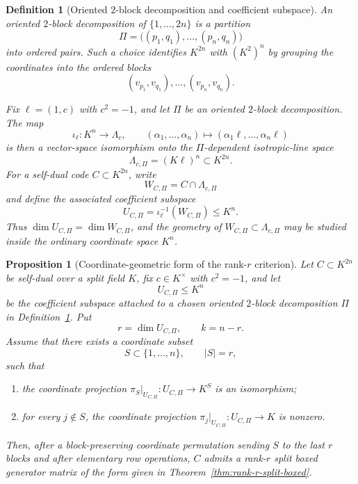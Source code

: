 \documentclass[12pt]{article}
\newtheorem{defn}{Definition}[section]
\newtheorem{prop}[theorem]{Proposition}
\begin{document}
\begin{defn}[Oriented \texorpdfstring{$2$}{2}-block decomposition and coefficient subspace]
\label{def:coefficient-subspace}
An \emph{oriented \(2\)-block decomposition} of \(\{1,\dots,2n\}\) is a partition
\[
\Pi=\bigl((p_1,q_1),\dots,(p_n,q_n)\bigr)
\]
into ordered pairs. Such a choice identifies \(K^{2n}\) with \((K^2)^n\) by grouping the coordinates into the ordered blocks
\[
(v_{p_1},v_{q_1}),\dots,(v_{p_n},v_{q_n}).
\]

Fix \(\ell=(1,c)\) with \(c^2=-1\), and let \(\Pi\) be an oriented \(2\)-block decomposition. The map
\[
\iota_\ell:K^n\longrightarrow \Lambda_c,\qquad
(\alpha_1,\dots,\alpha_n)\longmapsto (\alpha_1\ell,\dots,\alpha_n\ell)
\]
is then a vector-space isomorphism onto the \(\Pi\)-dependent isotropic-line space
\[
\Lambda_{c,\Pi}=(K\ell)^n\subset K^{2n}.
\]
For a self-dual code \(C\subset K^{2n}\), write
\[
W_{C,\Pi}=C\cap \Lambda_{c,\Pi}
\]
and define the associated coefficient subspace
\[
U_{C,\Pi}=\iota_\ell^{-1}(W_{C,\Pi})\le K^n.
\]
Thus \(\dim U_{C,\Pi}=\dim W_{C,\Pi}\), and the geometry of \(W_{C,\Pi}\subset \Lambda_{c,\Pi}\) may be studied inside the ordinary coordinate space \(K^n\).
\end{defn}

\begin{prop}[Coordinate-geometric form of the rank-\texorpdfstring{$r$}{r} criterion]
\label{prop:coordinate-geometric-rank-r}
Let \(C\subset K^{2n}\) be self-dual over a split field \(K\), fix \(c\in K^\times\) with \(c^2=-1\), and let
\[
U_{C,\Pi}\le K^n
\]
be the coefficient subspace attached to a chosen oriented \(2\)-block decomposition \(\Pi\) in Definition~\ref{def:coefficient-subspace}. Put
\[
r=\dim U_{C,\Pi},\qquad k=n-r.
\]
Assume that there exists a coordinate subset
\[
S\subset \{1,\dots,n\},\qquad |S|=r,
\]
such that
\begin{enumerate}
\item the coordinate projection \(\pi_S|_{U_{C,\Pi}}:U_{C,\Pi}\to K^S\) is an isomorphism;
\item for every \(j\notin S\), the coordinate projection \(\pi_j|_{U_{C,\Pi}}:U_{C,\Pi}\to K\) is nonzero.
\end{enumerate}
Then, after a block-preserving coordinate permutation sending \(S\) to the last \(r\) blocks and after elementary row operations, \(C\) admits a rank-\(r\) split boxed generator matrix of the form given in Theorem~\ref{thm:rank-r-split-boxed}.
\end{prop}
\end{document}
